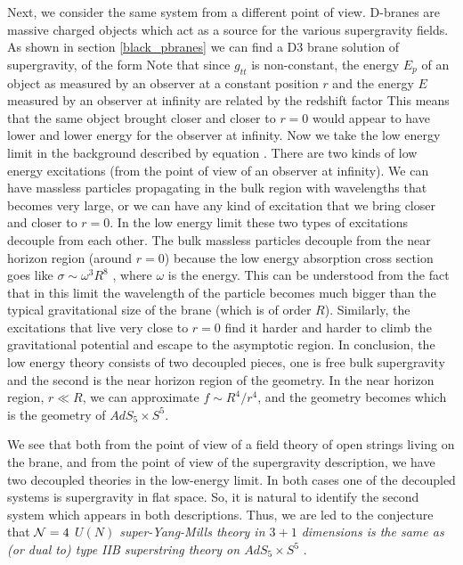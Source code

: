 Next, we consider
the same system from a different point of view.  D-branes are massive
charged objects which act as a source for the various supergravity
fields. As shown in section \ref{black_pbranes} we can find a D3 brane solution
\cite{Horowitz:1991cd} of supergravity, of the form
Note that since $g_{tt}$ is non-constant,
the energy $E_p$ of an object as measured by an observer 
at a constant  position $r$ and the energy $E$ measured by an observer at
infinity are related  by the redshift factor
 This means that the same object brought closer
and closer to $r =0$ would appear to have lower and lower energy 
for the observer at infinity. 
Now we take the low energy limit in the background described  by equation
\dthree. There are two kinds of low energy excitations (from the point
of view of an observer at infinity). 
We can have  massless particles propagating in the bulk region
with wavelengths that becomes very large, or we can have any kind
of excitation that we bring closer and closer to 
$r=0$. In the low energy limit these two types of excitations 
decouple from each other. The bulk massless particles decouple from
the near horizon region (around $r=0$)
 because the low energy absorption cross section goes like
$ \sigma \sim  \omega^3 R^8 $ \cite{Klebanov:1997kc,Gubser:1997yh},
 where $\omega $ is the 
energy. 
This can be understood from the 
fact that in this limit the wavelength of the particle becomes 
much bigger than  the typical gravitational size of the brane 
(which is of order $R$). 
Similarly, the excitations that live very close to $r = 0$ find it 
harder and harder to climb the gravitational potential and
escape to the asymptotic region. In conclusion, the low energy 
theory consists of two decoupled pieces, one is free bulk supergravity
and the second is the near horizon region of the geometry. 
In the near horizon region, $r \ll R $, we can approximate 
$f \sim R^4/r^4$, and
the geometry becomes 
which is the geometry of $AdS_5 \times S^5$. 

We see that both from the point of view of a field theory of open
strings living on the brane, and from the point of view of the
supergravity description, we have two decoupled theories in the
low-energy limit. In both cases one of the decoupled systems is
supergravity in flat space.  So, it is natural to identify the second
system which appears in both descriptions. Thus, we are led to the
conjecture that {\it ${\cal N} =4 $ $U(N)$ super-Yang-Mills theory in
$3+1$ dimensions is the same as (or dual to) type IIB superstring
theory on $AdS_5\times S^5$} \cite{Maldacena:1997re}.

